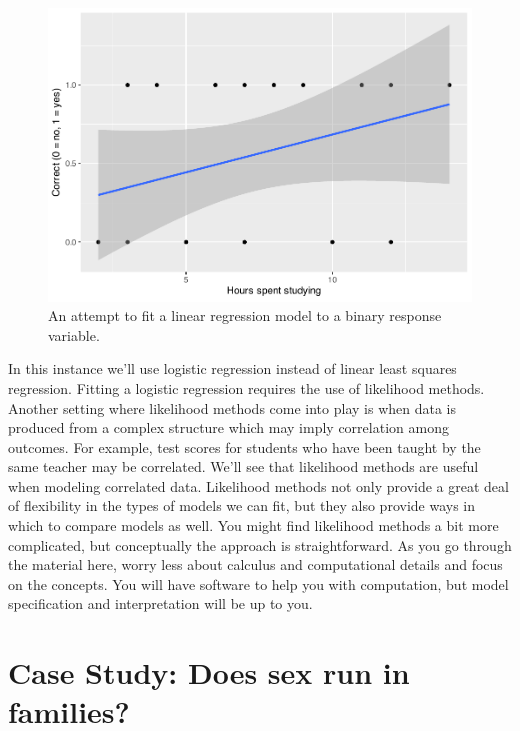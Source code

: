 \documentclass[
]{krantz}
\begin{document}
\begin{figure}

{\centering \includegraphics[width=0.9\linewidth]{bookdown-BeyondMLR_files/figure-latex/logistic1-1} 

}

\caption{An attempt to fit a linear regression model to a binary response variable.}\label{fig:logistic1}
\end{figure}

In this instance we'll use logistic regression instead of linear least squares regression. Fitting a logistic regression requires the use of likelihood methods. Another setting where likelihood methods come into play is when data is produced from a complex structure which may imply correlation among outcomes. For example, test scores for students who have been taught by the same teacher may be correlated. We'll see that likelihood methods are useful when modeling correlated data. Likelihood methods not only provide a great deal of flexibility in the types of models we can fit, but they also provide ways in which to compare models as well. You might find likelihood methods a bit more complicated, but conceptually the approach is straightforward. As you go through the material here, worry less about calculus and computational details and focus on the concepts. You will have software to help you with computation, but model specification and interpretation will be up to you.

\hypertarget{case-study-does-sex-run-in-families}{%
\section{Case Study: Does sex run in families?}\label{case-study-does-sex-run-in-families}}
\end{document}
